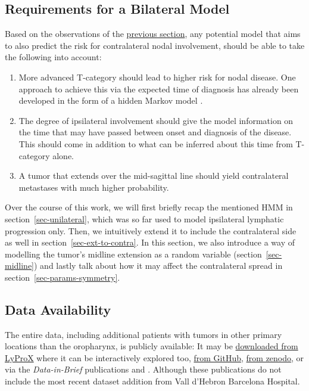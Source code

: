 \documentclass[
  sn-mathphys-num,
]{sn-jnl}
\providecommand{\tightlist}{%
  \setlength{\itemsep}{0pt}\setlength{\parskip}{0pt}}\usepackage{longtable,booktabs,array}
\begin{document}
\subsection{Requirements for a Bilateral Model}\label{sec-requirements}

Based on the observations of the \hyperref[sec-data-strat]{previous
section}, any potential model that aims to also predict the risk for
contralateral nodal involvement, should be able to take the following
into account:

\begin{enumerate}
\def\labelenumi{\arabic{enumi}.}
\tightlist
\item
  More advanced T-category should lead to higher risk for nodal disease.
  One approach to achieve this via the expected time of diagnosis has
  already been developed in the form of a hidden Markov model
  \citep{ludwig_hidden_2021}.
\item
  The degree of ipsilateral involvement should give the model
  information on the time that may have passed between onset and
  diagnosis of the disease. This should come in addition to what can be
  inferred about this time from T-category alone.
\item
  A tumor that extends over the mid-sagittal line should yield
  contralateral metastases with much higher probability.
\end{enumerate}

Over the course of this work, we will first briefly recap the mentioned
HMM in section~\ref{sec-unilateral}, which was so far used to model
ipsilateral lymphatic progression only. Then, we intuitively extend it
to include the contralateral side as well in
section~\ref{sec-ext-to-contra}. In this section, we also introduce a
way of modelling the tumor's midline extension as a random variable
(section~\ref{sec-midline}) and lastly talk about how it may affect the
contralateral spread in section~\ref{sec-params-symmetry}.

\subsection{Data Availability}\label{data-availability}

The entire data, including additional patients with tumors in other
primary locations than the oropharynx, is publicly available: It may be
\href{https://lyprox.org/patients/dataset}{downloaded from LyProX} where
it can be interactively explored too,
\href{https://github.com/rmnldwg/lydata}{from GitHub},
\href{https://zenodo.org/search?q=lydata}{from zenodo}, or via the
\emph{Data-in-Brief} publications \citet{ludwig_dataset_2022} and
\citet{ludwig_multi-centric_2023}. Although these publications do not
include the most recent dataset addition from Vall d'Hebron Barcelona
Hospital.
\end{document}
